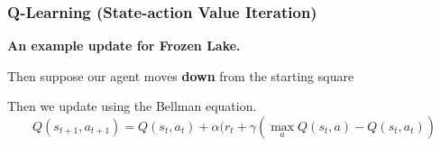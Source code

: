 \begin{frame}
\frametitle{Q-Learning (State-action Value Iteration)}
  \textbf{An example update for Frozen Lake.} 
  
   {
    Then suppose our agent moves \textbf{down} from the starting square
  }
   {
   Then we update using the Bellman equation.
   \begin{equation*}
     Q(s_{t+1}, a_{t+1}) = Q(s_t, a_t) + \alpha (r_t + \gamma (\max_a Q(s_t, a) - Q(s_t, a_t)) 
   \end{equation*}
    \begin{center}\end{center}}

\end{frame}

